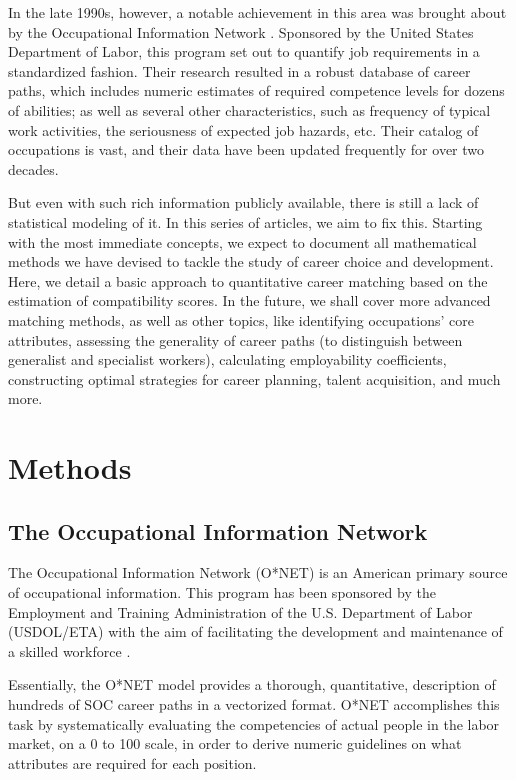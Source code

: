 \documentclass{article}
\begin{document}
In the late 1990s, however, a notable achievement in this area was brought about by the Occupational Information Network \parencite{onet1998data}. Sponsored by the United States Department of Labor, this program set out to quantify job requirements in a standardized fashion. Their research resulted in a robust database of career paths, which includes numeric estimates of required competence levels for dozens of abilities; as well as several other characteristics, such as frequency of typical work activities, the seriousness of expected job hazards, etc. Their catalog of occupations is vast, and their data have been updated frequently for over two decades.

But even with such rich information publicly available, there is still a lack of statistical modeling of it. In this series of articles, we aim to fix this. Starting with the most immediate concepts, we expect to document all mathematical methods we have devised to tackle the study of career choice and development. Here, we detail a basic approach to quantitative career matching based on the estimation of compatibility scores. In the future, we shall cover more advanced matching methods, as well as other topics, like identifying occupations' core attributes, assessing the generality of career paths (to distinguish between generalist and specialist workers), calculating employability coefficients, constructing optimal strategies for career planning, talent acquisition, and much more.

\section{Methods}
\subsection{The Occupational Information Network}
The Occupational Information Network (O*NET) is an American primary source of occupational information. This program has been sponsored by the Employment and Training Administration of the U.S. Department of Labor (USDOL/ETA) with the aim of facilitating the development and maintenance of a skilled workforce \parencite{onet2024about}.

Essentially, the O*NET model provides a thorough, quantitative, description of hundreds of SOC \parencite[Standard Occupational Classification, see][]{bls2018soc} career paths in a vectorized format. O*NET accomplishes this task by systematically evaluating the competencies of actual people in the labor market, on a 0 to 100 scale, in order to derive numeric guidelines on what attributes are required for each position.
\end{document}
